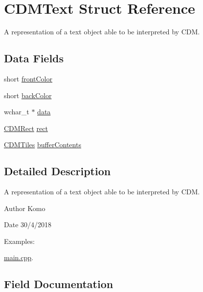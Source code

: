 \hypertarget{struct_c_d_m_text}{}\section{C\+D\+M\+Text Struct Reference}
\label{struct_c_d_m_text}


A representation of a text object able to be interpreted by C\+DM.  


\subsection*{Data Fields}
\begin{DoxyCompactItemize}
\item 
short \mbox{\hyperlink{struct_c_d_m_text_aaacd880862e20179647e2a4423a6fdd0}{front\+Color}}
\item 
short \mbox{\hyperlink{struct_c_d_m_text_a775cc897fb48457073cae34a85b735fe}{back\+Color}}
\item 
wchar\+\_\+t $\ast$ \mbox{\hyperlink{struct_c_d_m_text_a79d124c473298ee68f0edcf56ae99c71}{data}}
\item 
\mbox{\hyperlink{_c_d_m_8h_a23402dc2128c3c7f1e88e505a5631b9c}{C\+D\+M\+Rect}} \mbox{\hyperlink{struct_c_d_m_text_aa61e26c3b59930152cdaa0ce2dac8b14}{rect}}
\item 
\mbox{\hyperlink{struct_c_d_m_tiles}{C\+D\+M\+Tiles}} \mbox{\hyperlink{struct_c_d_m_text_a095e3adb5378aedc48f9a15d9f2e84b9}{buffer\+Contents}}
\end{DoxyCompactItemize}


\subsection{Detailed Description}
A representation of a text object able to be interpreted by C\+DM. 

\begin{DoxyAuthor}{Author}
Komo 
\end{DoxyAuthor}
\begin{DoxyDate}{Date}
30/4/2018 
\end{DoxyDate}
\begin{Desc}
\item[Examples\+: ]\par
\mbox{\hyperlink{main_8cpp-example}{main.\+cpp}}.\end{Desc}


\subsection{Field Documentation}
\mbox{\label{struct_c_d_m_text_a775cc897fb48457073cae34a85b735fe}} 
